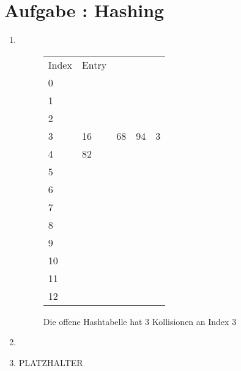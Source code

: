 \documentclass[12pt]{article}
\newcounter{exnum}
\newcommand{\aufgabe}[1]{\section*{Aufgabe \theexnum\stepcounter{exnum}: #1}} %
\begin{document}
\aufgabe{Hashing}

\begin{enumerate}
	\item \text{}\\
	
	\begin{figure}[!h]
	\centering
	\begin{tabular}{|l|l|lll}
\cline{1-2}
Index & Entry &                         &                         &                        \\ \cline{1-2}
0     &       &                         &                         &                        \\ \cline{1-2}
1     &       &                         &                         &                        \\ \cline{1-2}
2     &       &                         &                         &                        \\ \hline
3     & 16    & \multicolumn{1}{l|}{68} & \multicolumn{1}{l|}{94} & \multicolumn{1}{l|}{3} \\ \hline
4     & 82    &                         &                         &                        \\ \cline{1-2}
5     &       &                         &                         &                        \\ \cline{1-2}
6     &       &                         &                         &                        \\ \cline{1-2}
7     &       &                         &                         &                        \\ \cline{1-2}
8     &       &                         &                         &                        \\ \cline{1-2}
9     &       &                         &                         &                        \\ \cline{1-2}
10    &       &                         &                         &                        \\ \cline{1-2}
11    &       &                         &                         &                        \\ \cline{1-2}
12    &       &                         &                         &                        \\ \cline{1-2}
\end{tabular}
\caption{Die offene Hashtabelle hat 3 Kollisionen an Index 3}
	\end{figure}
	
	\item
	\begin{figure}[!h]
	
	\end{figure}
	\item PLATZHALTER
	
\end{enumerate}



\end{document}
